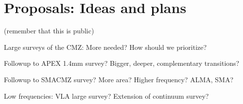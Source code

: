 \section{Proposals: Ideas and plans}
(remember that this is public)

Large surveys of the CMZ: More needed?  How should we prioritize?

Followup to APEX 1.4mm survey?  Bigger, deeper, complementary transitions?

Followup to SMACMZ survey?  More area?  Higher frequency?  ALMA, SMA?

Low frequencies: VLA large survey?  Extension of \citep{Law2008b} continuum survey?